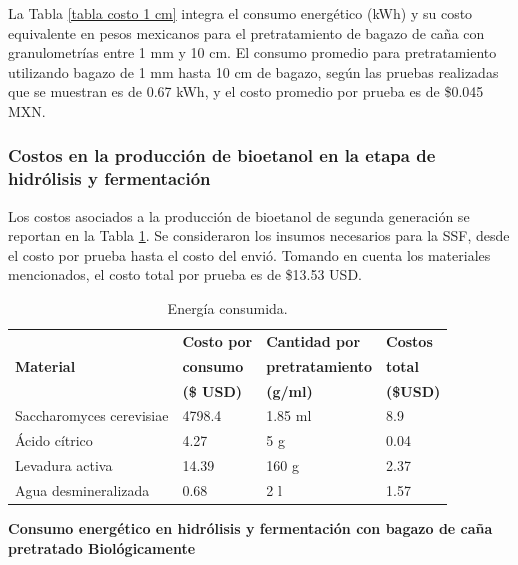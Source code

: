 \documentclass[12pt]{article}
\begin{document}
	
	La Tabla \ref{tabla costo 1 cm} integra el consumo energético (kWh) y su costo equivalente en pesos mexicanos para el pretratamiento de bagazo de caña con granulometrías entre 1 mm y 10 cm. El consumo promedio para pretratamiento utilizando bagazo de 1 mm hasta 10 cm de bagazo, según las pruebas realizadas que se muestran es de 0.67 kWh, y el costo promedio por prueba es de \$0.045 MXN.
	
	
	\subsubsection{Costos en la producción de bioetanol en la etapa de hidrólisis y fermentación}
	
Los costos asociados a la producción de bioetanol de segunda generación se reportan en la Tabla \ref{hidrolisis costos}. Se consideraron los insumos necesarios para la SSF, desde el costo por prueba hasta el costo del envió. Tomando en cuenta los materiales mencionados, el costo total por prueba es de \$13.53 USD.
	
			
			
		\begin{table}[H]
			\centering
			\caption{Energía consumida.}
			\label{hidrolisis costos}
			\begin{tabular}{|l|l|l|l|}
				\hline
				 & \textbf{Costo por} & \textbf{Cantidad por }  & \textbf{Costos} \\
				\textbf{Material} & \textbf{ consumo } & \textbf{ pretratamiento}  & \textbf{total} \\ 
				& \textbf{ (\$ USD)} & \textbf{ (g/ml)}  & \textbf{(\$USD)} \\ \hline
				Saccharomyces cerevisiae &4798.4 & 1.85 ml  & 8.9 \\ \hline
				Ácido cítrico & 4.27& 5 g  &0.04 \\ \hline
				Levadura activa &14.39 &160 g  & 2.37 \\ \hline
				Agua desmineralizada & 0.68  &2 l  & 1.57 \\ \hline
			\end{tabular}
		\end{table}
			
			
	\textbf{ Consumo energético en hidrólisis y fermentación con bagazo de caña pretratado Biológicamente }
	
\end{document}
